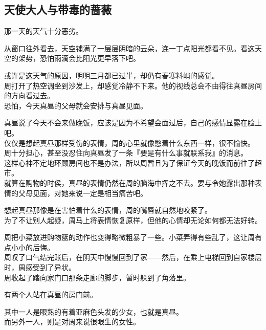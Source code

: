 \subsection{天使大人与带毒的蔷薇}

那一天的天气十分恶劣。

从窗口往外看去，天空铺满了一层层阴暗的云朵，连一丁点阳光都看不见。看这天空的架势，恐怕雨滴会比阳光更早落下吧。

或许是这天气的原因，明明三月都已过半，却仍有春寒料峭的感觉。\\

周打开了热空调坐到沙发上，却感觉冷静不下来。他的视线总会不由得往真昼房间的方向看过去。\\

恐怕，今天真昼的父母就会安排与真昼见面。

真昼说了今天不会来做晚饭，应该是因为不希望会面过后，自己的感情显露在脸上吧。\\

仅仅是想起真昼那样受伤的表情，周的心里就像憋着什么东西一样，很不愉快。\\

周十分担心，甚至没忍住向真昼发了一条『要是有什么事就联系我』的消息。\\

这样心神不定地环顾房间也不是办法，所以周暂且为了保证今天的晚饭而前往了超市。\\

就算在购物的时侯，真昼的表情仍然在周的脑海中挥之不去。要与令她露出那种表情的父母见面，对她来说一定是相当痛苦吧。

想起真昼那像是在害怕着什么的表情，周的嘴唇就自然地咬紧了。\\

为了不让别人起疑，周马上将表情恢复原样，但他的心情却无论如何都无法好转。

周把小菜放进购物篮的动作也变得略微粗暴了一些。小菜弄得有些乱了，这让周有点小小的后悔。\\

周叹了口气结完账后，在阴天中慢慢回到了家——然后，在乘上电梯回到自家楼层时，周感受到了异状。\\

周收起了踏向家门口那条走廊的脚步，暂时躲到了角落里。

有两个人站在真昼的房门前。

其中一人是眼熟的有着亚麻色头发的少女，也就是真昼。\\

而另外一人，则是对周来说很眼生的女性。

